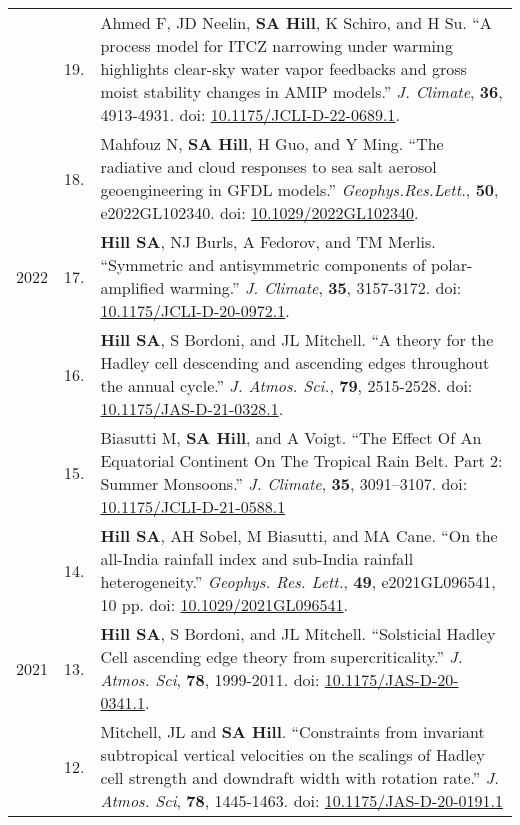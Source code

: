 \documentclass[letterpaper,11pt]{shillcv}
\begin{document}
\begin{longtable}{@{} Y{0.05\textwidth} >{\color{black}} p{0.04\textwidth} @{} L{0.91\textwidth} @{}}
     & 19. & Ahmed F, JD Neelin, \textbf{SA Hill}, K Schiro, and H Su. ``A process model for ITCZ narrowing under warming highlights clear-sky water vapor feedbacks and gross moist stability changes in AMIP models.'' \emph{J. Climate}, \textbf{36}, 4913-4931.  doi: \href{https://doi.org/10.1175/JCLI-D-22-0689.1}{10.1175/JCLI-D-22-0689.1}.\\
     & 18. & Mahfouz N, \textbf{SA Hill}, H Guo, and Y Ming. ``The radiative and cloud responses to sea salt aerosol geoengineering in GFDL models.''  \emph{Geophys.\@ Res.\@ Lett.}, \textbf{50}, e2022GL102340.  doi: \href{https://doi.org/10.1029/2022GL102340}{10.1029/2022GL102340}.\\
2022 & 17. & \textbf{Hill SA}, NJ Burls, A Fedorov, and TM Merlis.  ``Symmetric and antisymmetric components of polar-amplified warming.''  \emph{J. Climate}, \textbf{35}, 3157-3172.  doi: \href{https://doi.org/10.1175/JCLI-D-20-0972.1}{10.1175/JCLI-D-20-0972.1}.\\
     & 16. & \textbf{Hill SA}, S Bordoni, and JL Mitchell.  ``A theory for the Hadley cell descending and ascending edges throughout the annual cycle.''  \emph{J. Atmos. Sci.}, \textbf{79}, 2515-2528.  doi: \href{https://doi.org/10.1175/JAS-D-21-0328.1}{10.1175/JAS-D-21-0328.1}.\\
     & 15. & Biasutti M, \textbf{SA Hill}, and A Voigt.  ``The Effect Of An Equatorial Continent On The Tropical Rain Belt. Part 2: Summer Monsoons.''  \emph{J. Climate}, \textbf{35}, 3091–3107.  doi: \href{https://doi.org/10.1175/JCLI-D-21-0588.1}{10.1175/JCLI-D-21-0588.1}\\
     & 14. & \textbf{Hill SA}, AH Sobel, M Biasutti, and MA Cane.  ``On the all-India rainfall index and sub-India rainfall heterogeneity.''  \emph{Geophys. Res. Lett.}, \textbf{49}, e2021GL096541, 10 pp.  doi: \href{https://doi.org/10.1029/2021GL096541}{10.1029/2021GL096541}.\\
2021 & 13. & \textbf{Hill SA}, S Bordoni, and JL Mitchell.  ``Solsticial Hadley Cell ascending edge theory from supercriticality.''  \emph{J. Atmos. Sci}, \textbf{78}, 1999-2011.  doi: \href{https://doi.org/10.1175/JAS-D-20-0341.1}{10.1175/JAS-D-20-0341.1}.\\
     & 12. & Mitchell, JL and \textbf{SA Hill}.  ``Constraints from invariant
subtropical vertical velocities on the scalings of Hadley cell strength and
downdraft width with rotation rate.''  \emph{J. Atmos. Sci}, \textbf{78}, 1445-1463.  doi: \href{https://doi.org/10.1175/JAS-D-20-0191.1}{10.1175/JAS-D-20-0191.1}\\

\end{longtable}
\end{document}
